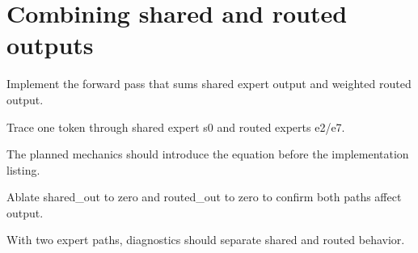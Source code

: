 \section{Combining shared and routed outputs}
\label{sec:ch08-combining-shared-and-routed-outputs}

Implement the forward pass that sums shared expert output and weighted routed output.



Trace one token through shared expert s0 and routed experts e2/e7.



The planned mechanics should introduce the equation before the implementation listing.





\begin{checkpointbox}
Ablate shared\_out to zero and routed\_out to zero to confirm both paths affect output.
\end{checkpointbox}

With two expert paths, diagnostics should separate shared and routed behavior.
